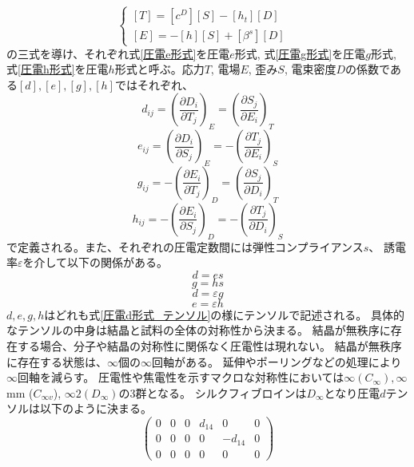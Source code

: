 \documentclass[dvipdfmx,12pt,a4paper]{jreport}
\begin{document}
			\begin{equation}
				\begin{cases}
					\left[T\right]=\left[c^D\right]\left[S\right]-\left[h_t\right]\left[D\right] & \\
					\left[E\right]=-\left[h\right]\left[S\right]+\left[\beta^s\right]\left[D\right]
				\end{cases}
				\label{圧電h形式}
			\end{equation}
			の三式を導け、それぞれ式\eqref{圧電e形式}を圧電$e$形式, 
			式\eqref{圧電g形式}を圧電$g$形式, 式\eqref{圧電h形式}を圧電$h$形式と呼ぶ。応力$T$, 電場$E$, 歪み$S$, 電束密度$D$の係数である$[d],[e],[g],[h]$ではそれぞれ、
			\begin{equation}
				d_{ij}=\left(\frac{\partial D_i}{\partial T_j}\right)_E=\left(\frac{\partial S_j}{\partial E_i}\right)_T
			\end{equation}
			\begin{equation}
				e_{ij}=\left(\frac{\partial D_i}{\partial S_j}\right)_E=-\left(\frac{\partial T_j}{\partial E_i}\right)_S
			\end{equation} 
			\begin{equation}
				g_{ij}=-\left(\frac{\partial E_i}{\partial T_j}\right)_D=\left(\frac{\partial S_j}{\partial D_i}\right)_T
			\end{equation}
			\begin{equation}
				h_{ij}=-\left(\frac{\partial E_i}{\partial S_j}\right)_D=-\left(\frac{\partial T_j}{\partial D_i}\right)_S
			\end{equation}
			で定義される。また、それぞれの圧電定数間には弾性コンプライアンス$s$、
			誘電率$\varepsilon$を介して以下の関係がある。
			\begin{equation}
				d = e s
				\label{e_to_d}
			\end{equation}
			\begin{equation}
				g = h s
			\end{equation}
			\begin{equation}
				d = \varepsilon g
			\end{equation}
			\begin{equation}
				e = \varepsilon h
			\end{equation}
			$d, e, g, h$はどれも式\eqref{圧電d形式_テンソル}の様にテンソルで記述される。
			具体的なテンソルの中身は結晶と試料の全体の対称性から決まる。
			結晶が無秩序に存在する場合、分子や結晶の対称性に関係なく圧電性は現れない。
			結晶が無秩序に存在する状態は、$\infty$個の$\infty$回軸がある。
			延伸やポーリングなどの処理により$\infty$回軸を減らす。
			圧電性や焦電性を示すマクロな対称性においては$\infty (C_\infty), \infty$ mm
			($C_{\infty v}$), $\infty 2(D_\infty)$の3群となる。
			シルクフィブロインは$D_\infty$となり圧電$d$テンソルは以下のように決まる。
			\begin{equation}
				\left(
				\begin{array}{cccccc}
					0 & 0 & 0 & d_{14} & 0 & 0 \\
					0 & 0 & 0 & 0 & -d_{14} & 0 \\
					0 & 0 & 0 & 0 & 0 & 0
				\end{array}\right)
			\end{equation}
			\newpage
\end{document}
